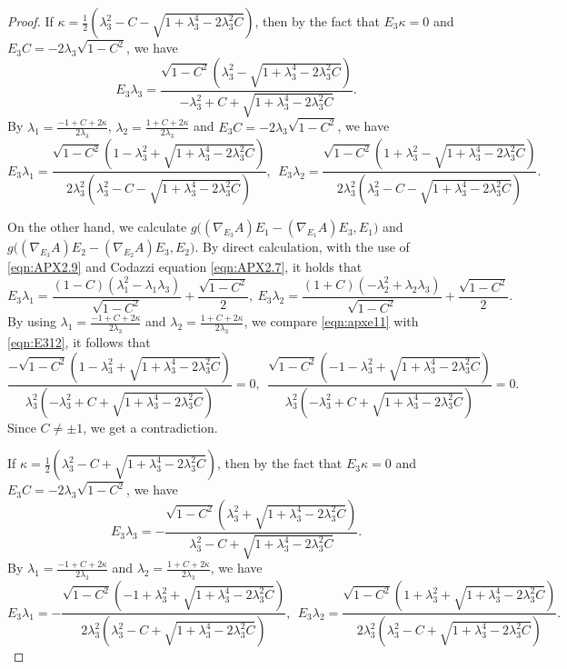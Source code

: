\documentclass[reqno]{amsart}%
\theoremstyle{definition}
\numberwithin{equation}{section}
\begin{document}
\begin{proof}
If $\kappa=\frac{1}{2}(\lambda_3^2-C-\sqrt{1+\lambda_3^4-2\lambda_3^2C})$, then by the fact that $E_3\kappa=0$ and $E_3C=-2\lambda_3\sqrt{1-C^2}$, we have 
$$
E_3\lambda_3=\frac{\sqrt{1-C^2}(\lambda_3^2-\sqrt{1+\lambda_3^4-2\lambda_3^2C})}{-\lambda_3^2+C+\sqrt{1+\lambda_3^4-2\lambda_3^2C}}. 
$$
By $\lambda_1=\frac{-1+C+2\kappa}{2\lambda_3}$,  $\lambda_2=\frac{1+C+2\kappa}{2\lambda_3}$ and $E_3C=-2\lambda_3\sqrt{1-C^2}$, 
we have 
\begin{equation}\label{eqn:E312}
E_3\lambda_1=\frac{\sqrt{1-C^2}(1-\lambda_3^2+\sqrt{1+\lambda_3^4-2\lambda_3^2C})}
{2\lambda_3^2(\lambda_3^2-C-\sqrt{1+\lambda_3^4-2\lambda_3^2C})},\ \ 
E_3\lambda_2=\frac{\sqrt{1-C^2}(1+\lambda_3^2-\sqrt{1+\lambda_3^4-2\lambda_3^2C})}
{2\lambda_3^2(\lambda_3^2-C-\sqrt{1+\lambda_3^4-2\lambda_3^2C})}.
\end{equation}

On the other hand, we calculate 
$g\big((\nabla_{E_3}A)E_{1}-(\nabla_{E_1}A)E_{3},E_1\big)$ and $g\big((\nabla_{E_3}A)E_{2}-(\nabla_{E_2}A)E_{3},E_2\big)$. 
By direct calculation, with the use of \eqref{eqn:APX2.9} and Codazzi equation \eqref{eqn:APX2.7}, it holds that  
\begin{equation}\label{eqn:apxe11}
E_3\lambda_1=\frac{(1-C)(\lambda_1^2-\lambda_1\lambda_3)}{\sqrt{1-C^2}}+\frac{\sqrt{1-C^2}}{2},\ 
E_3\lambda_2=\frac{(1+C)(-\lambda_2^2+\lambda_2\lambda_3)}{\sqrt{1-C^2}}+\frac{\sqrt{1-C^2}}{2}.
\end{equation}
By using $\lambda_1=\frac{-1+C+2\kappa}{2\lambda_3}$ and $\lambda_2=\frac{1+C+2\kappa}{2\lambda_3}$, we  compare \eqref{eqn:apxe11} with \eqref{eqn:E312}, it follows that 
$$
\frac{-\sqrt{1-C^2}(1-\lambda_3^2+\sqrt{1+\lambda_3^4-2\lambda_3^2C})}
{\lambda_3^2(-\lambda_3^2+C+\sqrt{1+\lambda_3^4-2\lambda_3^2C})}=0,\ \ 
\frac{\sqrt{1-C^2}(-1-\lambda_3^2+\sqrt{1+\lambda_3^4-2\lambda_3^2C})}
{\lambda_3^2(-\lambda_3^2+C+\sqrt{1+\lambda_3^4-2\lambda_3^2C})}=0. 
$$
Since $C\neq\pm1$, we get a contradiction.



If $\kappa=\frac{1}{2}(\lambda_3^2-C+\sqrt{1+\lambda_3^4-2\lambda_3^2C})$, then by the fact that $E_3\kappa=0$ and $E_3C=-2\lambda_3\sqrt{1-C^2}$, we have 
$$
E_3\lambda_3=-\frac{\sqrt{1-C^2}(\lambda_3^2+\sqrt{1+\lambda_3^4-2\lambda_3^2C})}{\lambda_3^2-C+\sqrt{1+\lambda_3^4-2\lambda_3^2C}}. 
$$
By $\lambda_1=\frac{-1+C+2\kappa}{2\lambda_3}$ and $\lambda_2=\frac{1+C+2\kappa}{2\lambda_3}$, we have 
\begin{equation}\label{eqn:E312s}
	E_3\lambda_1=-\frac{\sqrt{1-C^2}(-1+\lambda_3^2+\sqrt{1+\lambda_3^4-2\lambda_3^2C})}
	{2\lambda_3^2(\lambda_3^2-C+\sqrt{1+\lambda_3^4-2\lambda_3^2C})},\ \ 
	E_3\lambda_2=\frac{\sqrt{1-C^2}(1+\lambda_3^2+\sqrt{1+\lambda_3^4-2\lambda_3^2C})}
	{2\lambda_3^2(\lambda_3^2-C+\sqrt{1+\lambda_3^4-2\lambda_3^2C})}.
\end{equation}


\end{proof}
\end{document}
